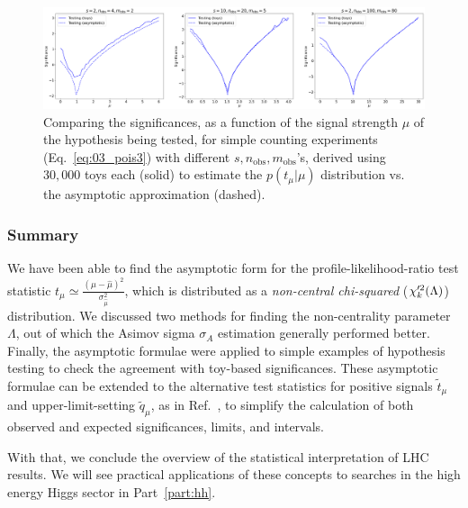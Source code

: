 \begin{figure}[htb]
  \centering
  \includegraphics[width=\textwidth]{figures/03-Stats/06-asymptotic-plr/5.png}
  \caption[Comparing the significances, as a function of the signal strength $\mu$ of the hypothesis being tested, for simple counting experiments (Eq.~\ref{eq:03_pois3}) with different $s, n_{\mathrm{obs}}, m_{\mathrm{obs}}$'s.]{Comparing the significances, as a function of the signal strength $\mu$ of the hypothesis being tested, for simple counting experiments (Eq.~\ref{eq:03_pois3}) with different $s, n_{\mathrm{obs}}, m_{\mathrm{obs}}$'s, derived using $30,000$ toys each (solid) to estimate the $p(t_\mu|\mu)$ distribution vs. the asymptotic approximation (dashed).}
  \label{fig:03_asym_significances}
\end{figure}


\subsubsection{Summary}

We have been able to find the asymptotic form for the profile-likelihood-ratio test statistic $t_\mu \simeq \frac{(\mu-\hat\mu)^2}{\sigma_{\hat\mu}^2}$, which is distributed as a \textit{non-central chi-squared} ($\chi^{\prime 2}_k(\Lambda)$) distribution.
We discussed two methods for finding the non-centrality parameter $\Lambda$, out of which the Asimov sigma $\sigma_A$ estimation generally performed better.
Finally, the asymptotic formulae were applied to simple examples of hypothesis testing to check the agreement with toy-based significances.
These asymptotic formulae can be extended to the alternative test statistics for positive signals $\tilde{t}_\mu$ and upper-limit-setting $\tilde{q}_\mu$, as in Ref.~\cite{Cowan:2010js}, to simplify the calculation of both observed and expected significances, limits, and intervals.

With that, we conclude the overview of the statistical interpretation of LHC results.
We will see practical applications of these concepts to searches in the high energy Higgs sector in Part~\ref{part:hh}.



